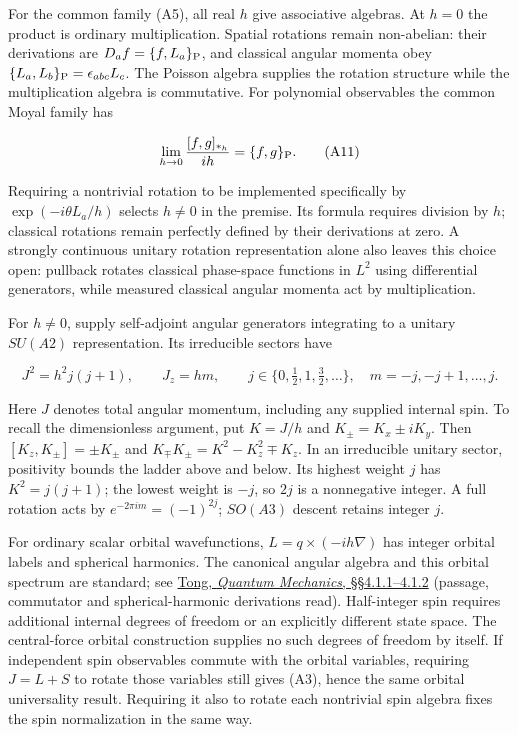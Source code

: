 \documentclass[11pt,a4paper]{article}
\begin{document}
For the common family (A5), all real \(h\) give associative algebras. At
\(h=0\) the product is ordinary multiplication. Spatial rotations remain
non-abelian: their derivations are \(D_a f=\{f,L_a\}_{\rm P}\), and
classical angular momenta obey
\(\{L_a,L_b\}_{\rm P}=\epsilon_{abc}L_c\). The Poisson algebra supplies
the rotation structure while the multiplication algebra is commutative.
For polynomial observables the common Moyal family has

\[
\lim_{h\to0}\frac{[f,g]_{*_h}}{ih}=\{f,g\}_{\rm P}. \tag{A11}
\]

Requiring a nontrivial rotation to be implemented specifically by
\(\exp(-i\theta L_a/h)\) selects \(h\ne0\) in the premise. Its formula
requires division by \(h\); classical rotations remain perfectly defined
by their derivations at zero. A strongly continuous unitary rotation
representation alone also leaves this choice open: pullback rotates
classical phase-space functions in \(L^2\) using differential
generators, while measured classical angular momenta act by
multiplication.

For \(h\ne0\), supply self-adjoint angular generators integrating to a
unitary \(SU(A2)\) representation. Its irreducible sectors have

\[
J^2=h^2j(j+1),\qquad J_z=hm,\qquad
j\in\{0,\tfrac12,1,\tfrac32,\ldots\},\quad
m=-j,-j+1,\ldots,j. \tag{A12}
\]

Here \(J\) denotes total angular momentum, including any supplied
internal spin. To recall the dimensionless argument, put \(K=J/h\) and
\(K_\pm=K_x\pm iK_y\). Then \([K_z,K_\pm]=\pm K_\pm\) and
\(K_\mp K_\pm=K^2-K_z^2\mp K_z\). In an irreducible unitary sector,
positivity bounds the ladder above and below. Its highest weight \(j\)
has \(K^2=j(j+1)\); the lowest weight is \(-j\), so \(2j\) is a
nonnegative integer. A full rotation acts by \(e^{-2\pi im}=(-1)^{2j}\);
\(SO(A3)\) descent retains integer \(j\).

For ordinary scalar orbital wavefunctions, \(L=q\times(-ih\nabla)\) has
integer orbital labels and spherical harmonics. The canonical angular
algebra and this orbital spectrum are standard; see
\href{https://www.damtp.cam.ac.uk/user/tong/qm/qmhtml/S4.html}{Tong,
\emph{Quantum Mechanics}, §§4.1.1--4.1.2} (passage, commutator and
spherical-harmonic derivations read). Half-integer spin requires
additional internal degrees of freedom or an explicitly different state
space. The central-force orbital construction supplies no such degrees
of freedom by itself. If independent spin observables commute with the
orbital variables, requiring \(J=L+S\) to rotate those variables still
gives (A3), hence the same orbital universality result. Requiring it
also to rotate each nontrivial spin algebra fixes the spin normalization
in the same way.
\end{document}
